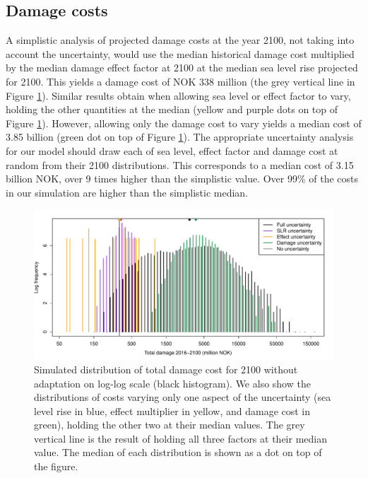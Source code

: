 \documentclass[draft,linenumbers]{agujournal}
\begin{document}
\subsection{Damage costs}
A simplistic analysis of projected damage costs at the year 2100, not taking into account the uncertainty, would use  the median  historical damage cost multiplied by  the median damage effect factor at 2100 at the median sea level rise projected for 2100. This yields a damage cost of NOK 338 million (the grey vertical line in Figure \ref{fig:costunc}). Similar results obtain when allowing sea level or effect factor to vary, holding the other quantities at the median (yellow and purple dots on top of Figure \ref{fig:costunc}). However, allowing only the damage cost to vary yields a median cost of 3.85 billion (green dot on top of Figure \ref{fig:costunc}). The appropriate uncertainty analysis for our model should draw each of sea level, effect factor and damage cost at random from their 2100 distributions. This corresponds to a median cost of 3.15 billion NOK, over 9 times higher than the simplistic value. Over 99\% of the costs in our simulation are higher than the simplistic median.

\begin{figure}[!hbpt]
\begin{center}
\includegraphics[width=0.8\linewidth]{UncertaintyLog.pdf}
\caption{Simulated distribution of total damage cost for 2100 without adaptation on log-log scale (black histogram). We also show the distributions of costs varying only one aspect of the uncertainty (sea level rise in blue, effect multiplier in yellow, and damage cost in green), holding the other two at their median values. The grey vertical line is the result of holding all three factors at their median value. The median of each distribution is shown as a dot on top of the figure.} 
\label{fig:costunc}
\end{center}
\end{figure}

\end{document}
